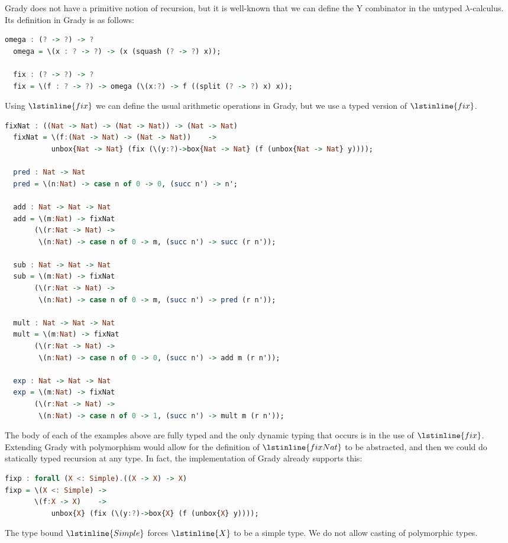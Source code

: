 Grady does not have a primitive notion of recursion, but it is
well-known that we can define the Y combinator in the untyped
$\lambda$-calculus.  Its definition in Grady is as follows:
\begin{lstlisting}[language=Haskell]
  omega : (? -> ?) -> ?
  omega = \(x : ? -> ?) -> (x (squash (? -> ?) x));
  
  fix : (? -> ?) -> ?
  fix = \(f : ? -> ?) -> omega (\(x:?) -> f ((split (? -> ?) x) x));
\end{lstlisting}
Using $\lstinline{fix}$ we can define the usual arithmetic operations
in Grady, but we use a typed version of $\lstinline{fix}$.
\begin{lstlisting}[language=Haskell]
  fixNat : ((Nat -> Nat) -> (Nat -> Nat)) -> (Nat -> Nat)
  fixNat = \(f:(Nat -> Nat) -> (Nat -> Nat))    ->
           unbox{Nat -> Nat} (fix (\(y:?)->box{Nat -> Nat} (f (unbox{Nat -> Nat} y))));
  
  pred : Nat -> Nat
  pred = \(n:Nat) -> case n of 0 -> 0, (succ n') -> n';

  add : Nat -> Nat -> Nat
  add = \(m:Nat) -> fixNat
       (\(r:Nat -> Nat) ->
        \(n:Nat) -> case n of 0 -> m, (succ n') -> succ (r n'));

  sub : Nat -> Nat -> Nat
  sub = \(m:Nat) -> fixNat
       (\(r:Nat -> Nat) ->
        \(n:Nat) -> case n of 0 -> m, (succ n') -> pred (r n'));        
        
  mult : Nat -> Nat -> Nat
  mult = \(m:Nat) -> fixNat
       (\(r:Nat -> Nat) ->
        \(n:Nat) -> case n of 0 -> 0, (succ n') -> add m (r n'));

  exp : Nat -> Nat -> Nat
  exp = \(m:Nat) -> fixNat
       (\(r:Nat -> Nat) ->
        \(n:Nat) -> case n of 0 -> 1, (succ n') -> mult m (r n'));
\end{lstlisting}
The body of each of the examples above are fully typed and the only
dynamic typing that occurs is in the use of $\lstinline{fix}$.
Extending Grady with polymorphism would allow for the definition of
$\lstinline{fixNat}$ to be abstracted, and then we could do statically
typed recursion at any type.  In fact, the implementation of Grady
already supports this:
\begin{lstlisting}[language=Haskell]
fixp : forall (X <: Simple).((X -> X) -> X)
fixp = \(X <: Simple) ->
       \(f:X -> X)    ->
           unbox{X} (fix (\(y:?)->box{X} (f (unbox{X} y))));
\end{lstlisting}
The type bound $\lstinline{Simple}$ forces $\lstinline{X}$ to be a
simple type.  We do not allow casting of polymorphic types.


